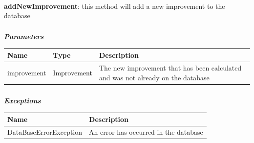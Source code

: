 					\paragraph{}
							\textbf{addNewImprovement}: this method will add a new improvement to the database
							\subparagraph{}
							\vspace{-3mm}
							\textit{\textbf{Parameters}}
							\vspace{-2mm}
								\begin{table}[!h]
									\begin{tabular}{L{0.2\textwidth}L{0.2\textwidth}L{0.4\textwidth}}
										\toprule
										\textbf{Name} & \textbf{Type} & \textbf{Description} \\
										\midrule
								  		improvement & Improvement & The new improvement that has been calculated and was not already on the database \\
								 		\bottomrule
									\end{tabular}
								\end{table}
							\subparagraph{}
							\vspace{-6mm}
								\textit{\textbf{Exceptions}}
								\vspace{-2mm}
									\begin{table}[!h]
									\begin{tabular}{ll}
										\toprule
										\textbf{Name} & \textbf{Description} \\
										\midrule
								  		DataBaseErrorException & An error has occurred in the database \\ 
								 		\bottomrule
									\end{tabular}
								\end{table}
								
